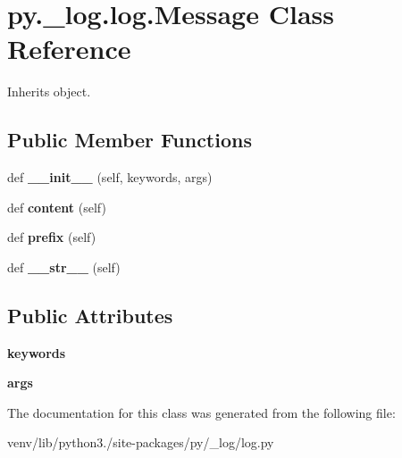 \hypertarget{classpy_1_1__log_1_1log_1_1_message}{}\section{py.\+\_\+log.\+log.\+Message Class Reference}
\label{classpy_1_1__log_1_1log_1_1_message}


Inherits object.

\subsection*{Public Member Functions}
\begin{DoxyCompactItemize}
\item 
\mbox{\label{classpy_1_1__log_1_1log_1_1_message_af5194c35648d00eb897b10e8a30ab1d1}} 
def {\bfseries \+\_\+\+\_\+init\+\_\+\+\_\+} (self, keywords, args)
\item 
\mbox{\label{classpy_1_1__log_1_1log_1_1_message_a38747f905df39e56259deacdb9f07859}} 
def {\bfseries content} (self)
\item 
\mbox{\label{classpy_1_1__log_1_1log_1_1_message_a32f1dbadaaf975a2061fe3dfa3af2d3d}} 
def {\bfseries prefix} (self)
\item 
\mbox{\label{classpy_1_1__log_1_1log_1_1_message_ac787137e4fba8650c6db95281f9b7c4c}} 
def {\bfseries \+\_\+\+\_\+str\+\_\+\+\_\+} (self)
\end{DoxyCompactItemize}
\subsection*{Public Attributes}
\begin{DoxyCompactItemize}
\item 
\mbox{\label{classpy_1_1__log_1_1log_1_1_message_a90ef19c8e910f4e223ab90319648d162}} 
{\bfseries keywords}
\item 
\mbox{\label{classpy_1_1__log_1_1log_1_1_message_aae1a7b2c28e11eb935c9878e67fdfa22}} 
{\bfseries args}
\end{DoxyCompactItemize}


The documentation for this class was generated from the following file\+:\begin{DoxyCompactItemize}
\item 
venv/lib/python3./site-\/packages/py/\+\_\+log/log.\+py\end{DoxyCompactItemize}
